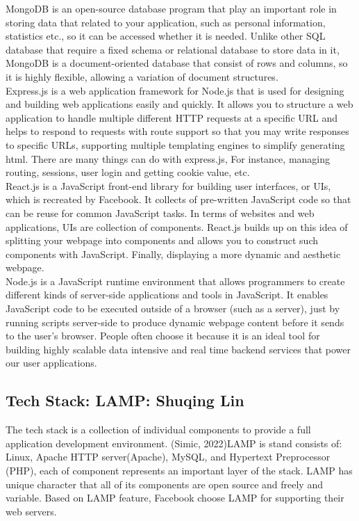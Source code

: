 \documentclass[a4paper, 11pt]{report}
\begin{document}
\noindent MongoDB is an open-source database program that play an important role in storing data that related to your application, such as personal information, statistics etc., so it can be accessed whether it is needed. Unlike other SQL database that require a fixed schema or relational database to store data in it, MongoDB is a document-oriented database that consist of rows and columns, so it is highly flexible, allowing a variation of document structures.\\

\noindent Express.js is a web application framework for Node.js that is used for designing and building web applications easily and quickly. It allows you to structure a web application to handle multiple different HTTP requests at a specific URL and helps to respond to requests with route support so that you may write responses to specific URLs, supporting multiple templating engines to simplify generating html. There are many things can do with express.js, For instance, managing routing, sessions, user login and getting cookie value, etc.\\

\noindent React.js is a JavaScript front-end library for building user interfaces, or UIs, which is recreated by Facebook. It collects of pre-written JavaScript code so that can be reuse for common JavaScript tasks. In terms of websites and web applications, UIs are collection of components. React.js builds up on this idea of splitting your webpage into components and allows you to construct such components with JavaScript. Finally, displaying a more dynamic and aesthetic webpage.\\

\noindent Node.js is a JavaScript runtime environment that allows programmers to create different kinds of server-side applications and tools in JavaScript. It enables JavaScript code to be executed outside of a browser (such as a server), just by running scripts server-side to produce dynamic webpage content before it sends to the user’s browser. People often choose it because it is an ideal tool for building highly scalable data intensive and real time backend services that power our user applications.\\

\subsection{Tech Stack: LAMP: Shuqing Lin}
\noindent The tech stack is a collection of individual components to provide a full application development environment. (Simic, 2022)LAMP is stand consists of: Linux, Apache HTTP server(Apache), MySQL, and Hypertext Preprocessor (PHP), each of component represents an important layer of the stack. LAMP has unique character that all of its components are open source and freely and variable.  Based on LAMP feature, Facebook choose LAMP for supporting their web servers.\\
\end{document}
